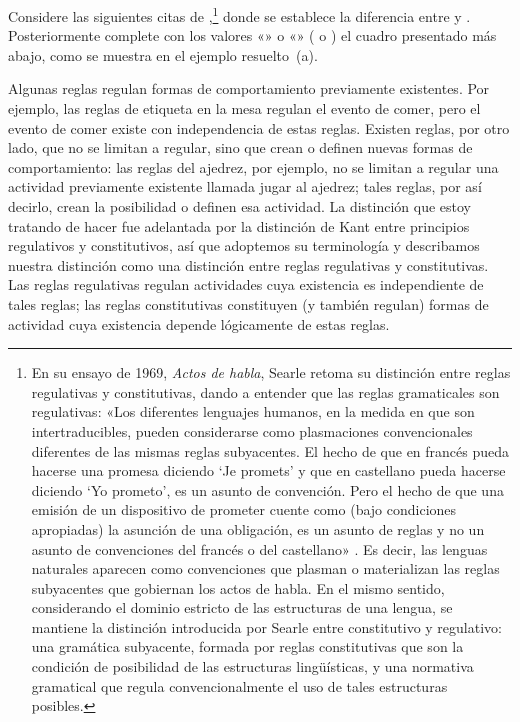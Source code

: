 \begin{ejercicio}\label{ej:02-searle}
Considere las siguientes citas de \textcite[55]{searle1964},\footnote{En su
ensayo de 1969, \textit{Actos de habla}, Searle retoma su distinción entre
reglas regulativas y constitutivas, dando a entender que las reglas
gramaticales son regulativas: «Los diferentes lenguajes humanos, en la medida
en que son intertraducibles, pueden considerarse como plasmaciones
convencionales diferentes de las mismas reglas subyacentes. El hecho de que en
francés pueda hacerse una promesa diciendo \enquote*{Je promets} y que en
castellano pueda hacerse diciendo \enquote*{Yo prometo}, es un asunto de
convención. Pero el hecho de que una emisión de un dispositivo de prometer
cuente como (bajo condiciones apropiadas) la asunción de una obligación, es un
asunto de reglas y no un asunto de convenciones del francés o del castellano»
\parencite[48-49]{searle1994}. Es decir, las lenguas naturales aparecen como
convenciones que plasman o materializan las reglas subyacentes que gobiernan
los actos de habla. En el mismo sentido, considerando el dominio estricto de
las estructuras de una lengua, se mantiene la distinción introducida por Searle
entre constitutivo y regulativo: una gramática subyacente, formada por reglas
constitutivas que son la condición de posibilidad de las estructuras
lingüísticas, y una normativa gramatical que regula convencionalmente el uso de
tales estructuras posibles.} donde se establece la diferencia entre
 y . Posteriormente
complete con los valores «\mas» o «\menos» ( o ) el cuadro
presentado más abajo, como se muestra en el ejemplo resuelto~(a).

\begin{exe}
  \ex Algunas reglas regulan formas de comportamiento previamente existentes.
      Por ejemplo, las reglas de etiqueta en la mesa regulan el evento de
      comer, pero el evento de comer existe con independencia de estas reglas.
      Existen reglas, por otro lado, que no se limitan a regular, sino que
      crean o definen nuevas formas de comportamiento: las reglas del ajedrez,
      por ejemplo, no se limitan a regular una actividad previamente existente
      llamada jugar al ajedrez; tales reglas, por así decirlo, crean la
      posibilidad o definen esa actividad.
  \ex La distinción que estoy tratando de hacer fue adelantada por la
      distinción de Kant entre principios regulativos y constitutivos, así que
      adoptemos su terminología y describamos nuestra distinción como una
      distinción entre reglas regulativas y constitutivas. Las reglas
      regulativas regulan actividades cuya existencia es independiente de tales
      reglas; las reglas constitutivas constituyen (y también regulan) formas de
      actividad cuya existencia depende lógicamente de estas reglas.
\end{exe}


\end{ejercicio}
